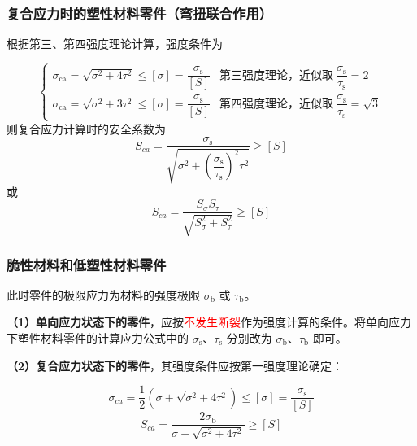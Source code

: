 \subsubsection{复合应力时的塑性材料零件（弯扭联合作用）}

根据第三、第四强度理论计算，强度条件为

\begin{theorem}[复合应力塑性材料零件的强度条件]
\label{thm:复合静应力强度}
\begin{equation}
	\begin{cases}
		\sigma_{\mathrm{ca}} = \sqrt{\sigma^2 + 4\tau^2} \le [\sigma] = \dfrac{\sigma_{\mathrm{s}}}{[S]} & \text{第三强度理论，近似取}\ \dfrac{\sigma_{\mathrm{s}}}{\tau_{\mathrm{s}}}=2 \\[2ex]
		\sigma_{\mathrm{ca}} = \sqrt{\sigma^2 + 3\tau^2} \le [\sigma] = \dfrac{\sigma_{\mathrm{s}}}{[S]} & \text{第四强度理论，近似取}\ \dfrac{\sigma_{\mathrm{s}}}{\tau_{\mathrm{s}}}=\sqrt{3}
	\end{cases}
	\label{eq:强度:复合静应力强度}
\end{equation}
则复合应力计算时的安全系数为
\begin{equation}
	S_{ca}=\frac{\sigma_{\mathrm{s}}}{\sqrt{\sigma^2+\left(\dfrac{\sigma_{\mathrm{s}}}{\tau_{\mathrm{s}}}\right)^2\tau^2}}\geq[S]
	\label{eq:强度:复合应力安全系数1}
\end{equation}
或
\begin{equation}
	S_{ca}=\frac{S_\sigma S_\tau}{\sqrt{S_\sigma^2+S_\tau^2}}\geq[S]
	\label{eq:强度:复合应力安全系数2}
\end{equation}
\end{theorem}

\subsubsection{脆性材料和低塑性材料零件}

此时零件的极限应力为材料的强度极限 $\sigma_{\mathrm{b}}$ 或 $\tau_{\mathrm{b}}$。

\textbf{（1）单向应力状态下的零件}，应按\textcolor{red}{不发生断裂}作为强度计算的条件。将单向应力下塑性材料零件的计算应力公式中的 $\sigma_{\mathrm{s}}$、$\tau_{\mathrm{s}}$ 分别改为 $\sigma_{\mathrm{b}}$、$\tau_{\mathrm{b}}$ 即可。

\textbf{（2）复合应力状态下的零件}，其强度条件应按第一强度理论确定：

\begin{theorem}[脆性材料复合应力零件的强度条件]
\label{thm:脆性复合应力强度}
\begin{equation}
	\sigma_{ca}=\frac{1}{2}\left(\sigma+\sqrt{\sigma^2+4\tau^2}\right)\le[\sigma]=\frac{\sigma_{\mathrm{s}}}{[S]}
	\label{eq:强度:脆性复合应力强度}
\end{equation}
\begin{equation}
	S_{ca}=\frac{2\sigma_{\mathrm{b}}}{\sigma+\sqrt{\sigma^2+4\tau^2}}\geq[S]
	\label{eq:强度:脆性复合应力安全系数}
\end{equation}
\end{theorem}

